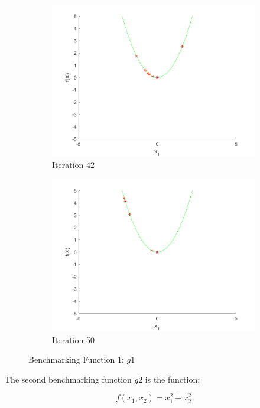 \begin{figure}
\begin{subfigure}[b]{0.4\textwidth}
    \includegraphics[width=\textwidth]{img/smpl/circ/loa-iter-42}
    \caption{Iteration 42}
    \label{fig:s1-iter-6}
  \end{subfigure}
  \begin{subfigure}[b]{0.4\textwidth}
    \includegraphics[width=\textwidth]{img/smpl/circ/loa-iter-50}
    \caption{Iteration 50}
    \label{fig:s1-iter-7}
  \end{subfigure}
  \caption{Benchmarking Function 1: $g1$}
\end{figure}

\par The second benchmarking function $g2$ is the function:

$$
  f(x_1, x_2) = x_1^2 + x_2^2
$$


